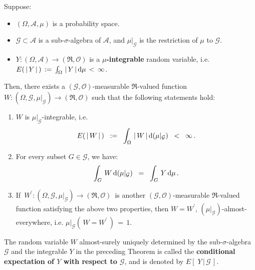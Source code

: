 \begin{theorem}
\label{Thm:ExistenceConditionalExpectation}
\mbox{}\vskip 0.2cm
\noindent
Suppose:
\begin{itemize}
\item
	$(\Omega,\mathcal{A},\mu)$ is a probability space.
\item
	$\mathcal{G} \subset \mathcal{A}$ is a sub-$\sigma$-algebra of $\mathcal{A}$,
	and $\mu\vert_{\mathcal{G}}$ is the restriction of $\mu$ to $\mathcal{G}$.
\item
	$Y : (\Omega,\mathcal{A}) \longrightarrow (\Re,\mathcal{O})$ is a \textbf{\color{red}$\mu$-integrable} random variable,
	i.e. $E\!\left(\,\vert\,Y\,\vert\,\right) \,:=\, \int_{\Omega}\, \vert\, Y\,\vert \,\textnormal{d}\mu \,<\, \infty$.
\end{itemize}
Then, there exists a $(\mathcal{G},\mathcal{O})$-measurable $\Re$-valued function
$W : (\Omega,\mathcal{G},\mu\vert_{\mathcal{G}}) \longrightarrow (\Re,\mathcal{O})$
such that the following statements hold:
\begin{enumerate}
\item
	$W$ is $\mu\vert_{\mathcal{G}}$-integrable, i.e.
	\begin{equation*}
	E\!\left(\,\vert\,W\,\vert\,\right)
	\;\; := \;\;
	\int_{\Omega}\,\vert\,W\,\vert\,\textnormal{d}(\mu\vert_{\mathcal{G}})
	\;\; < \;\;
	\infty\,.
	\end{equation*}
\item
	For every subset $G \in \mathcal{G}$, we have:
	\begin{equation*}
	\int_{G}\, W \,\textnormal{d}(\mu\vert_{\mathcal{G}})
	\;\; = \;\;
	\int_{G}\, Y \,\textnormal{d}\mu\,.
	\end{equation*}
\item
	If \,$W^{\prime} : (\Omega,\mathcal{G},\mu\vert_{\mathcal{G}}) \longrightarrow (\Re,\mathcal{O})$\, is
	another $(\mathcal{G},\mathcal{O})$-measurable $\Re$-valued function
	satisfying the above two properties, then
	$W = W^{\prime}$, $(\mu\vert_{\mathcal{G}})$-almost-everywhere,
	i.e. $\mu\vert_{\mathcal{G}}\!\left(\,W = W^{\prime}\,\right) \,=\, 1$. 
\end{enumerate}
\end{theorem}

\begin{remark}\mbox{}\vskip 0.1cm\noindent
The random variable $W$ almost-surely uniquely determined
by the sub-$\sigma$-algebra $\mathcal{G}$ and the integrable $Y$
in the preceding Theorem is called the
\textbf{\color{red}conditional expectation of $Y$ with respect to $\mathcal{G}$},
and is denoted by $E\!\left[\;Y\,\vert\,\mathcal{G}\,\right]$.
\end{remark}


